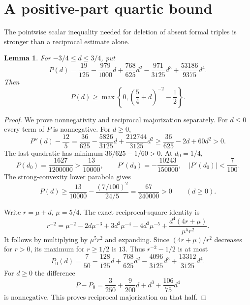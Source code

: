 \documentclass[11pt]{article}
\newtheorem{lemma}[theorem]{Lemma}
\begin{document}
\section{A positive-part quartic bound}
The pointwise scalar inequality needed for deletion of absent formal
triples is stronger than a reciprocal estimate alone.
\begin{lemma}\label{lem:quartic}
For $-3/4\le d\le3/4$, put
\[
 P(d)=\frac{19}{125}-\frac{979}{1000}d
      +\frac{768}{625}d^2-\frac{971}{3125}d^3
      +\frac{53186}{9375}d^4.
\]
Then
\begin{equation}\label{eq:majorant}
 P(d)\ge\max\left\{0,\left(\frac54+d\right)^{-2}-\frac12\right\}.
\end{equation}
\end{lemma}
\begin{proof}
We prove nonnegativity and reciprocal majorization separately.
For $d\le0$ every term of $P$ is nonnegative. For $d\ge0$,
\[
 P''(d)-\frac{12}5
 =\frac{36}{625}-\frac{5826}{3125}d+\frac{212744}{3125}d^2
 \ge\frac{36}{625}-2d+60d^2>0.
\]
The last quadratic has minimum $36/625-1/60>0$. At $d_0=1/4$,
\[
 P(d_0)=\frac{1627}{1200000}>\frac{13}{10000},\qquad
 P'(d_0)=-\frac{10243}{150000},\quad |P'(d_0)|<\frac7{100}.
\]
The strong-convexity lower parabola gives
\[
 P(d)\ge\frac{13}{10000}-\frac{(7/100)^2}{24/5}
       =\frac{67}{240000}>0\qquad(d\ge0).
\]

Write $r=\mu+d$, $\mu=5/4$. The exact reciprocal-square identity is
\begin{equation}\label{eq:reciprocal}
 r^{-2}=\mu^{-2}-2d\mu^{-3}+3d^2\mu^{-4}-4d^3\mu^{-5}
          +\frac{d^4(4r+\mu)}{\mu^5r^2}.
\end{equation}
It follows by multiplying by $\mu^5r^2$ and expanding. Since
$(4r+\mu)/r^2$ decreases for $r>0$, its maximum for $r\ge1/2$
is $13$. Thus $r^{-2}-1/2$ is at most
\[
 P_0(d)=\frac7{50}-\frac{128}{125}d+\frac{768}{625}d^2
       -\frac{4096}{3125}d^3+\frac{13312}{3125}d^4.
\]
For $d\ge0$ the difference
\[
 P-P_0=\frac3{250}+\frac9{200}d+d^3+\frac{106}{75}d^4
\]
is nonnegative. This proves reciprocal majorization on that half.


\end{proof}
\end{document}
